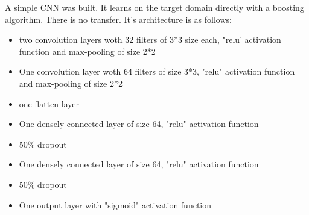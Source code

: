 \documentclass[11 pt]{article}
\begin{document}
\begin{samepage}
A simple CNN was built. It learns on the target domain directly with a boosting algorithm. There is no transfer. It's architecture is as follows:\\
\medskip \nopagebreak
  \begin{itemize}
    \item two convolution layers woth 32 filters of 3*3 size each, "relu' activation function and max-pooling of size 2*2
    \nopagebreak
    \item One convolution layer woth 64 filters of size 3*3, "relu" activation function and max-pooling of size 2*2
    \nopagebreak 
    \item one flatten layer
    \nopagebreak
    \item One densely connected layer of size 64, "relu" activation function
    \nopagebreak
    \item 50\% dropout
    \nopagebreak
    \item One densely connected layer of size 64, "relu" activation function
    \nopagebreak
    \item 50\% dropout
    \nopagebreak
    \item One output layer with "sigmoid" activation function
  \end{itemize}
\end{samepage}

\end{document}
